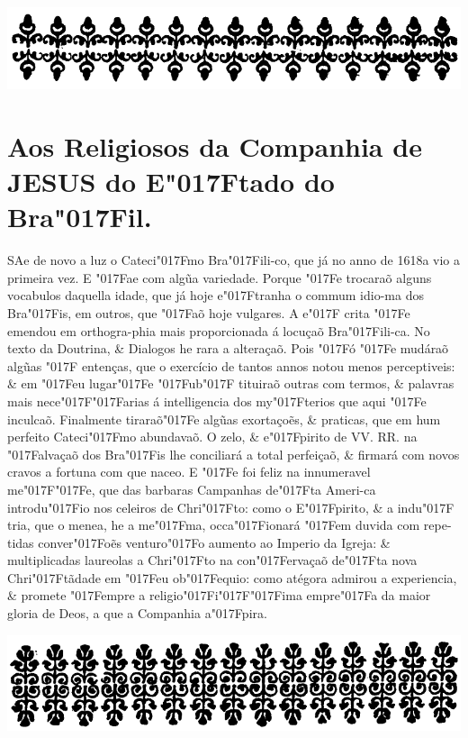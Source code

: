 \documentclass[openany,titlepage,12pt]{book}
\renewcommand{\chaptermark}[1]{\markboth{#1}{}}
\renewcommand{\sectionmark}[1]{\gdef\rightmark{#1}}
\newcommand{\lgS}{\char"017F}
\newcommand{\lgSS}{\char"017F\char"017F}
\begin{document}
\begin{center}
    \includegraphics[scale=0.20]{02-aos_religiosos.png}
\end{center}
\section{Aos Religiosos da Companhia de 
JESUS do E\lgS tado do Bra\lgS il.}
\chaptermark{}
\sectionmark{}
\vspace*{14pt}

\lettrine[findent=2pt, nindent=0pt, lines=2]
{S}{A}e de novo a luz o Cateci\lgS mo Bra\lgS ili-co, 
que já no anno de 1618a vio a primeira vez. E \lgS ae
com algũa variedade. Porque \lgS e trocaraõ alguns vocabulos 
daquella idade, que já hoje e\lgS tranha o commum idio-\linebreak ma
dos Bra\lgS is, em outros, que \lgS aõ hoje vulgares. A e\lgS 
crita \lgS e emendou em orthogra-phia mais proporcionada á 
locuçaõ Bra\lgS ili-ca. No texto da Doutrina, \& Dialogos he
rara a alteraçaõ. Pois \lgS ó \lgS e mudáraõ algũas \lgS 
entenças, que o exercício de tantos annos notou menos 
perceptiveis: \& em \lgS eu lugar\linebreak \lgS e \lgS ub\lgS  
tituiraõ outras com termos, \& palavras mais nece\lgSS arias 
á intelligencia dos my\lgS terios que aqui \lgS e inculcaõ. 
Finalmente tiraraõ\lgS e  algũas exortaçoẽs, \& praticas, que em
hum perfeito Cateci\lgS mo abundavaõ. O zelo, \& e\lgS pirito
de VV. RR. na \lgS alvaçaõ dos Bra\lgS is lhe conciliará a 
total perfeiçaõ, \& firmará com novos cravos a fortuna com 
que naceo. E \lgS e foi feliz na innumeravel me\lgSS e, que 
das barbaras Campanhas de\lgS ta Ameri-ca introdu\lgS io nos
celeiros de Chri\lgS to: como o E\lgS pirito, \& a indu\lgS
tria, que o menea, he a me\lgS ma, occa\lgS ionará \lgS em 
duvida com repe-tidas conver\lgS oẽs venturo\lgS o aumento ao
Imperio da Igreja: \& multiplicadas laureolas a Chri\lgS to
na con\lgS ervaçaõ de\lgS ta nova Chri\lgS tãdade em \lgS eu
ob\lgS equio: como atégora admirou a experiencia, \& promete
\lgS empre a religio\lgS i\lgSS ima empre\lgS a da maior 
gloria de Deos, a que a Companhia a\lgS pira.
\newpage

\begin{center}
    \vspace*{12pt}
    \includegraphics[scale=0.24]{03-advertencias.png}
\end{center}
\unskip
\end{document}
